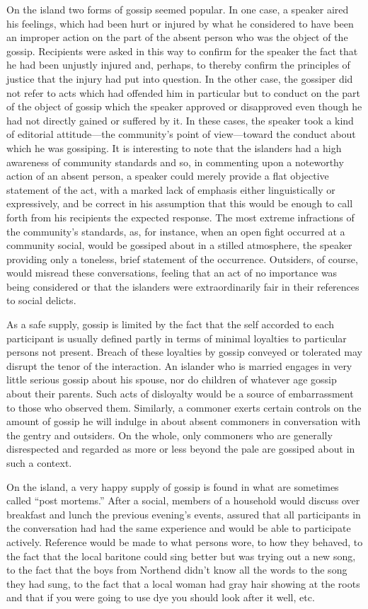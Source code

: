 \documentclass[twoside,symmetric,nobib,justified]{tufte-book}
\begin{document}
On the island two forms of gossip seemed popular. In one case, a speaker
aired his feelings, which had been hurt or injured by what he considered
to have been an improper action on the part of the absent person who was
the object of the gossip. Recipients were asked in this way to confirm
for the speaker the fact that he had been unjustly injured and, perhaps,
to thereby confirm the principles of justice that the injury had put
into question. In the other case, the gossiper did not refer to acts
which had offended him in particular but to conduct on the part of the
object of gossip which the speaker approved or disapproved even though
he had not directly gained or suffered by it. In these cases, the
speaker took a kind of editorial attitude---the community's point of
view---toward the conduct about which he was gossiping. It is
interesting to note that the islanders had a high awareness of community
standards and so, in commenting upon a noteworthy action of an absent
person, a speaker could merely provide a flat objective statement of the
act, with a marked lack of emphasis either linguistically or
expressively, and be correct in his assumption that this would be enough
to call forth from his recipients the expected response. The most
extreme infractions of the community's standards, as, for instance, when
an open fight occurred at a community social, would be gossiped about in
a stilled atmosphere, the speaker providing only a toneless, brief
statement of the occurrence. Outsiders, of course, would misread these
conversations, feeling that an act of no importance was being considered
or that the islanders were extraordinarily fair in their references to
social delicts.

As a safe supply, gossip is limited by the fact that the self accorded
to each participant is usually defined partly in terms of minimal
loyalties to particular persons not present. Breach of these loyalties
by gossip conveyed or tolerated may disrupt the tenor of the
interaction. An islander who is married engages in very little serious
gossip about his spouse, nor do children of whatever age gossip about
their parents. Such acts of disloyalty would be a source of
embarrassment to those who observed them. Similarly, a commoner exerts
certain controls on the amount of gossip he will indulge in about absent
commoners in conversation with the gentry and outsiders. On the whole,
only commoners who are generally disrespected and regarded as more or
less beyond the pale are gossiped about in such a context.

On the island, a very happy supply of gossip is found in what are
sometimes called ``post mortems.'' After a social, members of a
household would discuss over breakfast and lunch the previous evening's
events, assured that all participants in the conversation had had the
same experience and would be able to participate actively. Reference
would be made to what persons wore, to how they behaved, to the fact
that the local baritone could sing better but was trying out a new song,
to the fact that the boys from Northend didn't know all the words to the
song they had sung, to the fact that a local woman had gray hair showing
at the roots and that if you were going to use dye you should look after
it well, etc.
\end{document}
